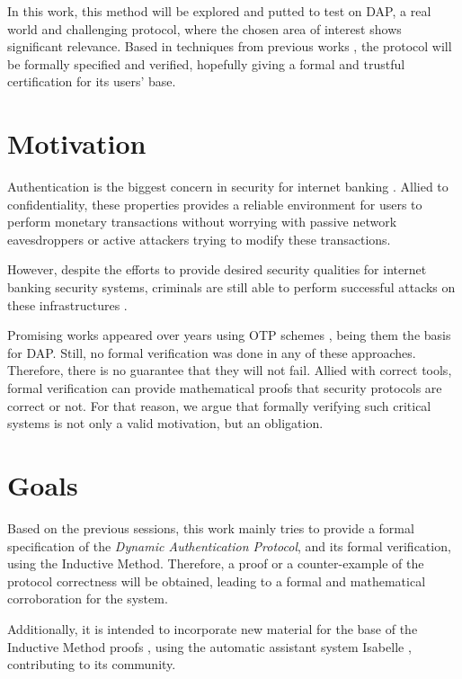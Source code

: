 In this work, this method will be explored and putted to test on DAP, a real world and challenging protocol, where the chosen area of interest shows significant relevance. Based in techniques from previous works \cite{accountability, inductive-on-tls, paulson-inductive}, the protocol will be formally specified and verified, hopefully giving a formal and trustful certification for its users' base.





\section{Motivation}
Authentication is the biggest concern in security for internet banking \cite{banking-security}. Allied to confidentiality, these properties provides a reliable environment for users to perform monetary transactions without worrying with passive network eavesdroppers or active attackers trying to modify these transactions.

However, despite the efforts to provide desired security qualities for internet banking security systems, criminals are still able to perform successful attacks on these infrastructures \cite{attacks-on-internet-banking}.

Promising works appeared over years using OTP schemes \cite{otp-mobile, otp-qrcode}, being them the basis for DAP. Still, no formal verification was done in any of these approaches. Therefore, there is no guarantee that they will not fail. Allied with correct tools, formal verification can provide mathematical proofs that security protocols are correct or not. For that reason, we argue that formally verifying such critical systems is not only a valid motivation, but an obligation.




\section{Goals}
Based on the previous sessions, this work mainly tries to provide a formal specification of the \textit{Dynamic Authentication Protocol}, and its formal verification, using the Inductive Method. Therefore, a proof or a counter-example of the protocol correctness will be obtained, leading to a formal and mathematical corroboration for the system.

Additionally, it is intended to incorporate new material for the base of the Inductive Method proofs \cite{isabelle-hol-auth}, using the automatic assistant system Isabelle \cite{isabelle}, contributing to its community.


